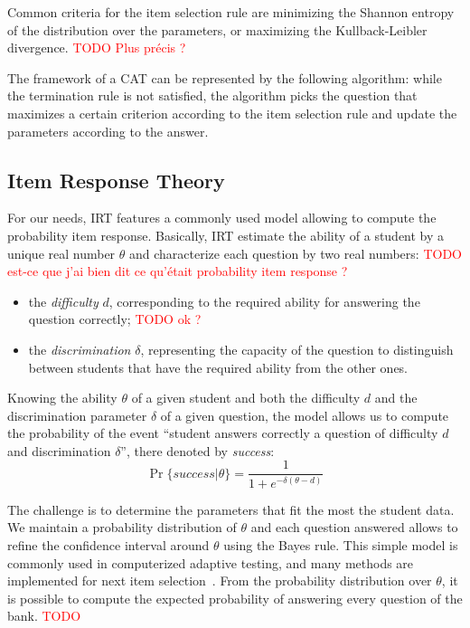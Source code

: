 \documentclass{sig-alternate}
\newcommand\alert[1]{\textcolor{red}{#1}}
\begin{document}
Common criteria for the item selection rule are minimizing the Shannon entropy of the distribution over the parameters, or maximizing the Kullback-Leibler divergence. \alert{TODO Plus précis ?}

The framework of a CAT can be represented by the following algorithm: while the termination rule is not satisfied, the algorithm picks the question that maximizes a certain criterion according to the item selection rule and update the parameters according to the answer.

\subsection{Item Response Theory}

For our needs, IRT features a commonly used model allowing to compute the probability item response. Basically, IRT estimate the ability of a student by a unique real number $\theta$ and characterize each question by two real numbers: \alert{TODO est-ce que j'ai bien dit ce qu'était probability item response ?}

\begin{itemize}
\item the \emph{difficulty} $d$, corresponding to the required ability for answering the question correctly; \alert{TODO ok ?}
\item the \emph{discrimination} $\delta$, representing the capacity of the question to distinguish between students that have the required ability from the other ones.
\end{itemize}

Knowing the ability $\theta$ of a given student and both the difficulty $d$ and the discrimination parameter $\delta$ of a given question, the model allows us to compute the probability of the event “student answers correctly a question of difficulty $d$ and discrimination $\delta$”, there denoted by \emph{success}:
\[ \Pr\{success|\theta\} = \frac1{1+e^{-\delta(\theta - d)}} \]

The challenge is to determine the parameters that fit the most the student data. We maintain a probability distribution of $\theta$ and each question answered allows to refine the confidence interval around $\theta$ using the Bayes rule. This simple model is commonly used in computerized adaptive testing, and many methods are implemented for next item selection~\cite{MagisRaiche2012}. From the probability distribution over $\theta$, it is possible to compute the expected probability of answering every question of the bank. \alert{TODO}
\end{document}
